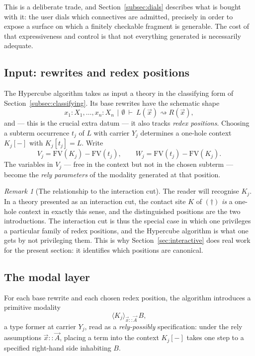\documentclass[11pt]{article}
\theoremstyle{definition}
\theoremstyle{plain}
\theoremstyle{remark}
\newtheorem{remark}[definition]{Remark}
\newcommand{\rsq}{\rightsquigarrow}
\newcommand{\angles}[3]{\langle #1 \rangle_{#2}\,#3}
\newcommand{\fv}{\mathrm{FV}}
\newcommand{\ctxbar}{\,|\,}
\begin{document}
This is a deliberate trade, and Section~\ref{subsec:dials} describes what is bought with
it: the user dials which connectives are admitted, precisely in order to expose a surface
on which a finitely checkable fragment is generable. The cost of that expressiveness and
control is that not everything generated is necessarily adequate.

\subsection{Input: rewrites and redex positions}

The Hypercube algorithm takes as input a theory in the classifying form of
Section~\ref{subsec:classifying}. Its base rewrites have the schematic shape
\[
  x_1{:}X_1, \dots, x_n{:}X_n \ \ctxbar\ \emptyset \ \vdash\ L(\vec x) \rsq R(\vec x) ,
\]
and --- this is the crucial extra datum --- it also tracks \emph{redex positions}.
Choosing a subterm occurrence $t_j$ of $L$ with carrier $Y_j$ determines a one-hole
context $K_j[-]$ with $K_j[t_j] = L$. Write
\[
  V_j = \fv(K_j) - \fv(t_j), \qquad W_j = \fv(t_j) - \fv(K_j) .
\]
The variables in $V_j$ --- free in the context but not in the chosen subterm --- become
the \emph{rely parameters} of the modality generated at that position.

\begin{remark}[The relationship to the interaction cut]
The reader will recognise $K_j$. In a theory presented as an interaction cut, the contact
site $K$ of $(\dagger)$ \emph{is} a one-hole context in exactly this sense, and the
distinguished positions are the two introductions. The interaction cut is thus the
special case in which one privileges a particular family of redex positions, and the
Hypercube algorithm is what one gets by not privileging them. This is why
Section~\ref{sec:interactive} does real work for the present section: it identifies which
positions are canonical.
\end{remark}

\subsection{The modal layer}
\label{subsec:modal}

For each base rewrite and each chosen redex position, the algorithm introduces a primitive
modality
\[
  \angles{K_j}{\vec x :: \vec A}{B} ,
\]
a type former at carrier $Y_j$, read as a \emph{rely-possibly} specification: under the
rely assumptions $\vec x :: \vec A$, placing a term into the context $K_j[-]$ takes one
step to a specified right-hand side inhabiting $B$.
\end{document}
